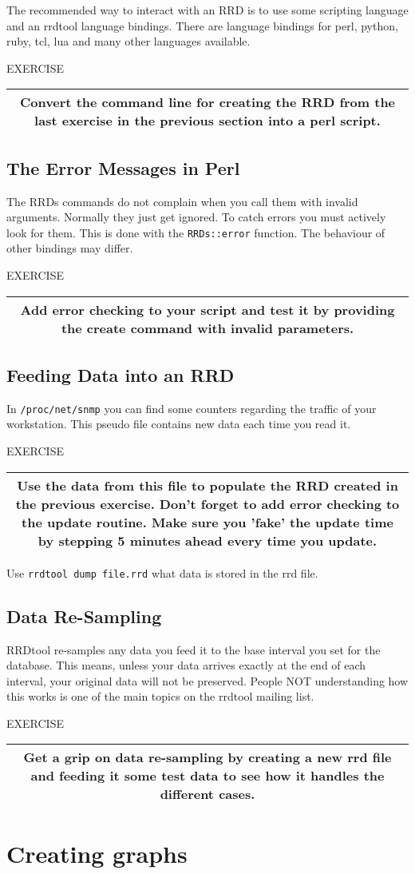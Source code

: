\documentclass[a4paper,12pt]{article}
\newenvironment{work}{\textsf{\tiny EXERCISE}\nopagebreak\\[0.3ex]\begin{tabular}{|c|}
 \hline
 \begin{minipage}{0.965\linewidth}%
 \setlength{\parskip}{1.6ex plus 0.6ex minus 0.4ex}%
 \rule{0pt}{2.8ex}\ignorespaces}
{\rule[-1.8ex]{0pt}{0pt}\end{minipage}\\
 \hline
 \end{tabular}}
\newcommand{\ex}[1]{\subsection{#1}}
\newcommand{\cmd}[1]{\texttt{\mbox{#1}}}
\begin{document}
The recommended way to interact with an RRD is to use some scripting
language and an rrdtool language bindings. There are language bindings for
perl, python, ruby, tcl, lua and many other languages available.

\begin{work}
Convert the command line for creating the RRD from the last exercise
in the previous section into a perl script.
\end{work}

\ex{The Error Messages in Perl}
The RRDs commands do not complain when you call them with invalid
arguments. Normally they just get ignored. To catch errors you must
actively look for them. This is done with the \cmd{RRDs::error}
function. The behaviour of other bindings may differ.

\begin{work}
Add error checking to your script and test it by providing the
create command with invalid parameters.
\end{work}

\newpage
\ex{Feeding Data into an RRD}
In \cmd{/proc/net/snmp} you can find some counters regarding the
traffic of your workstation. This pseudo file contains new data each time you read it.

\begin{work}
  Use the data from this file to populate the RRD created in the previous
  exercise. Don't forget to add error checking to the update routine. Make
  sure you 'fake' the update time by stepping 5 minutes ahead every time you
  update.
\end{work}

Use \cmd{rrdtool dump file.rrd} what data is stored in the rrd file.

\ex{Data Re-Sampling}

RRDtool re-samples any data you feed it to the base interval you set for the
database. This means, unless your data arrives exactly at the end of each
interval, your original data will not be preserved. People NOT understanding
how this works is one of the main topics on the rrdtool mailing list.

\begin{work}
Get a grip on data re-sampling by creating a new rrd file and feeding it some
test data to see how it handles the different cases.
\end{work}

\newpage
\section{Creating graphs}
\end{document}
